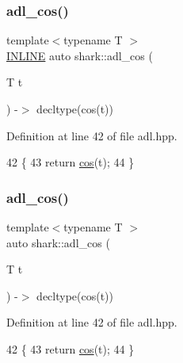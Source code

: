 \subsubsection{\texorpdfstring{adl\+\_\+cos()}{adl\_cos()}\hspace{0.1cm}{\footnotesize\ttfamily [1/2]}}
{\footnotesize\ttfamily template$<$typename T $>$ \\
\hyperlink{common_8hpp_a2eb6f9e0395b47b8d5e3eeae4fe0c116}{I\+N\+L\+I\+NE} auto shark\+::adl\+\_\+cos (\begin{DoxyParamCaption}\item[{T}]{t }\end{DoxyParamCaption}) -\/$>$  decltype(cos(t))\hspace{0.3cm}{\ttfamily [inline]}}



Definition at line 42 of file adl.\+hpp.


\begin{DoxyCode}
42                                                  \{
43         \textcolor{keywordflow}{return} \hyperlink{namespaceshark_1_1ndim_a5dfdad9111c53551d5b4a60d8d68820f}{cos}(t);
44     \}
\end{DoxyCode}
\hypertarget{namespaceshark_a310c9d62035abf67cd44771cce04678c}{}\label{namespaceshark_a310c9d62035abf67cd44771cce04678c} 
\subsubsection{\texorpdfstring{adl\+\_\+cos()}{adl\_cos()}\hspace{0.1cm}{\footnotesize\ttfamily [2/2]}}
{\footnotesize\ttfamily template$<$typename T $>$ \\
auto shark\+::adl\+\_\+cos (\begin{DoxyParamCaption}\item[{T}]{t }\end{DoxyParamCaption}) -\/$>$ decltype(cos(t)) \hspace{0.3cm}{\ttfamily [inline]}}



Definition at line 42 of file adl.\+hpp.


\begin{DoxyCode}
42                                                  \{
43         \textcolor{keywordflow}{return} \hyperlink{namespaceshark_1_1ndim_a5dfdad9111c53551d5b4a60d8d68820f}{cos}(t);
44     \}
\end{DoxyCode}
\hypertarget{namespaceshark_a64eebbcdfd6c5bd1d6358a87dae2a26f}{}\label{namespaceshark_a64eebbcdfd6c5bd1d6358a87dae2a26f} 
